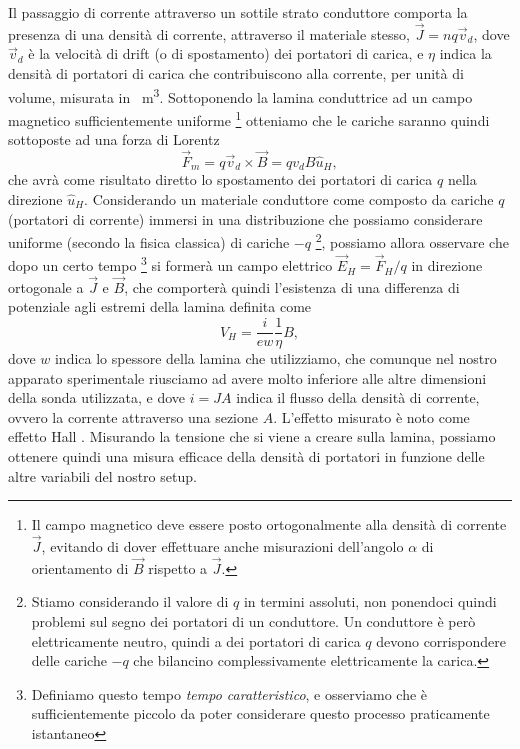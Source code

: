 \documentclass[
    prl,
    reprint, 
    superscriptaddress, 
    altaffilletter, 
    amsmath, 
    amssymb, 
    a4paper,
    varvw]{revtex4-2}
\begin{document}
Il passaggio di corrente attraverso un sottile strato conduttore comporta la presenza di una densità di corrente, attraverso il materiale stesso, $\vec{J}=nq\vec{v}_d$, dove $\vec{v}_d$ è la velocità di drift (o di spostamento) dei portatori di carica, e $\eta$ indica la densità di portatori di carica che contribuiscono alla corrente, per unità di volume, misurata in \si{\per\cubic\metre}. Sottoponendo la lamina conduttrice ad un campo magnetico sufficientemente uniforme \footnote{Il campo magnetico deve essere posto ortogonalmente alla densità di corrente $\vec{J}$, evitando di dover effettuare anche misurazioni dell'angolo $\alpha$ di orientamento di $\vec{B}$ rispetto a $\vec{J}$.} otteniamo che le cariche saranno quindi sottoposte ad una forza di Lorentz \begin{equation}
    \vec{F}_m = q\vec{v}_d \times \vec{B} = qv_dB\hat{u}_H,\label{eq:lorentz_F_m}
\end{equation} che avrà come risultato diretto lo spostamento dei portatori di carica $q$ nella direzione $\hat{u}_H$. Considerando un materiale conduttore come composto da cariche $q$ (portatori di corrente) immersi in una distribuzione che possiamo considerare uniforme (secondo la fisica classica) di cariche $-q$ \footnote{Stiamo considerando il valore di $q$ in termini assoluti, non ponendoci quindi problemi sul segno dei portatori di un conduttore. Un conduttore è però elettricamente neutro, quindi a dei portatori di carica $q$ devono corrispondere delle cariche $-q$ che bilancino complessivamente elettricamente la carica. }, possiamo allora osservare che dopo un certo tempo \footnote{Definiamo questo tempo \emph{tempo caratteristico}, e osserviamo che è sufficientemente piccolo da poter considerare questo processo praticamente istantaneo} si formerà un campo elettrico $\vec{E}_H = \vec{F}_H/q$ in direzione ortogonale a $\vec{J}$ e $\vec{B}$, che comporterà quindi l'esistenza di una differenza di potenziale agli estremi della lamina definita come \begin{equation}
    V_H = \frac{i}{ew}\frac{1}{\eta}B,\label{eq:2}
\end{equation} dove $w$ indica lo spessore della lamina che utilizziamo, che comunque nel nostro apparato sperimentale riusciamo ad avere molto inferiore alle altre dimensioni della sonda utilizzata, e dove $i=JA$ indica il flusso della densità di corrente, ovvero la corrente attraverso una sezione $A$. L'effetto misurato è noto come effetto Hall \cite{Hall_1897}. Misurando la tensione che si viene a creare sulla lamina, possiamo ottenere quindi una misura efficace della densità di portatori in funzione delle altre variabili del nostro setup. 
\end{document}

